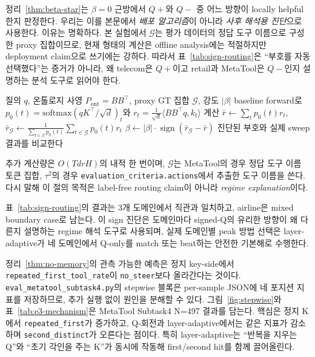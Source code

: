 정리~\ref{thm:beta-star}는 $\beta=0$ 근방에서 $Q+$와 $Q-$ 중 어느 방향이 locally helpful한지 판정한다. 우리는 이를 본문에서 \emph{배포 알고리즘}이 아니라 \emph{사후 해석용 진단}으로 사용한다. 이유는 명확하다. 본 실험에서 $\mathcal{G}$는 평가 데이터의 정답 도구 이름으로 구성한 proxy 집합이므로, 현재 형태의 계산은 offline analysis에는 적절하지만 deployment claim으로 쓰기에는 강하다. 따라서 표~\ref{tab:sign-routing}은 ``부호를 자동 선택했다''는 증거가 아니라, 왜 telecom은 $Q+$이고 retail과 MetaTool은 $Q-$인지 설명하는 분석 도구로 읽어야 한다.

\begin{algorithm}[h]
\caption{Signed Q 부호 진단 (offline analysis)}\label{alg:asr}
\begin{algorithmic}[1]
\REQUIRE 질의 $q$, 온톨로지 사영 $P_{\mathrm{ont}} = BB^\top$, proxy GT 집합 $\mathcal{G}$, 강도 $|\beta|$
\STATE baseline forward로 $p_0(t) = \mathrm{softmax}(qK^\top/\sqrt d)_t$와 $r_t = \tfrac{1}{\sqrt d}\langle BB^\top q, k_t\rangle$ 계산
\STATE $\bar r \leftarrow \sum_t p_0(t) r_t$,\quad $\bar r_{\mathcal{G}} \leftarrow \frac{1}{\sum_{t\in\mathcal{G}} p_0(t)}\sum_{t\in\mathcal{G}} p_0(t) r_t$
\STATE $\beta \leftarrow |\beta| \cdot \operatorname{sign}(\bar r_{\mathcal{G}} - \bar r)$
\STATE 진단된 부호와 실제 sweep 결과를 비교한다
\end{algorithmic}
\end{algorithm}

추가 계산량은 $O(TdrH)$의 내적 한 번이며, $\mathcal{G}$는 MetaTool의 경우 정답 도구 이름 토큰 집합, $\tau^2$의 경우 \texttt{evaluation\_criteria.actions}에서 추출한 도구 이름을 쓴다. 다시 말해 이 절의 목적은 label-free routing claim이 아니라 \emph{regime explanation}이다.

표~\ref{tab:sign-routing}의 결과는 3개 도메인에서 직관과 일치하고, airline은 mixed boundary case로 남는다. 이 sign 진단은 도메인마다 signed-Q의 유리한 방향이 왜 다른지 설명하는 regime 해석 도구로 사용되며, 실제 도메인별 peak 방법 선택은 layer-adaptive가 네 도메인에서 Q-only를 match 또는 beat하는 안전한 기본해로 수행한다.

정리~\ref{thm:no-memory}의 관측 가능한 예측은 정지 key-side에서 \texttt{repeated\_first\_tool\_rate}이 \texttt{no\_steer}보다 올라간다는 것이다. \texttt{eval\_metatool\_subtask4.py}의 stepwise 블록은 per-sample JSON에 네 포지션 지표를 저장하므로, 추가 실행 없이 원인을 분해할 수 있다. 그림~\ref{fig:stepwise}와 표~\ref{tab:e3-mechanism}은 MetaTool Subtask4 N=497 결과를 담는다. 핵심은 정지 K에서 \texttt{repeated\_first}가 증가하고, Q-회전과 layer-adaptive에서는 같은 지표가 감소하며 \texttt{second\_distinct}가 오른다는 점이다. 특히 layer-adaptive는 ``반복을 지우는 Q''와 ``초기 각인을 주는 K''가 동시에 작동해 first/second hit를 함께 끌어올린다.

